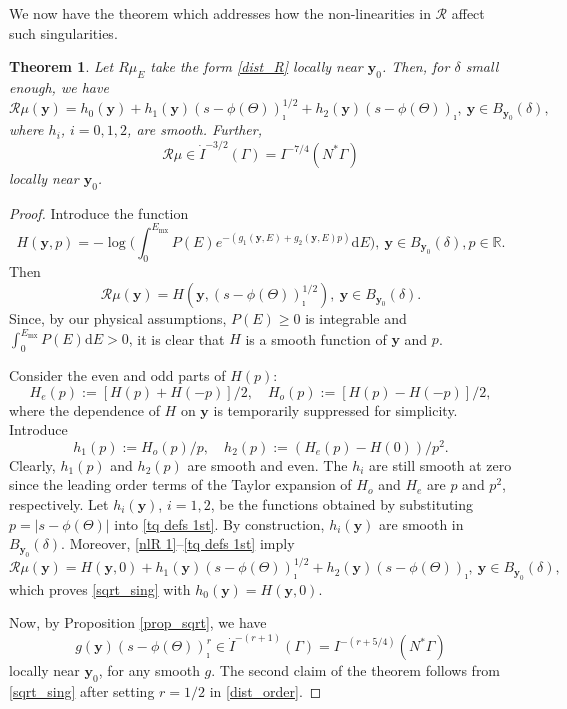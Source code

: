 \documentclass[11pt]{article}
\newcommand{\ac}[1]{\begin{quotation}\textbf{Sasha's comment:\
}{\textit{#1}}\end{quotation}}
\newcommand{\be}{\begin{equation}}
\newcommand{\ee}{\end{equation}}
\newcommand{\CR}{\mathcal R}
\newcommand{\br}{\mathbb{R}}
\newcommand{\dd}{\mathrm{d}}
\newcommand{\de}{\delta}
\numberwithin{equation}{section}
\newcommand{\vy}{\mathbf{y}}
\newtheorem{theorem}{Theorem}[section]
\theoremstyle{definition}
\begin{document}
We now have the theorem which addresses how the non-linearities in $\mathcal{R}$ affect such singularities.
\begin{theorem}
\label{log_sing}
Let $R\mu_E$ take the form \eqref{dist_R} locally near $\vy_0$. Then, for $\delta$ small enough, we have
\be
\label{sqrt_sing}
\mathcal{R}\mu(\vy) = h_0(\vy) + h_1(\vy) (s - \phi(\Theta))^{1/2}_\imath + h_2(\vy) (s - \phi(\Theta))_\imath,\ \vy\in B_{\vy_0}(\delta),
\ee
where $h_i$, $i=0,1,2$, are smooth. Further,
\be\label{Rmu distr}
\CR\mu \in \dot{I}^{-3/2}(\Gamma)=I^{-7/4}(N^*\Gamma)
\ee
locally near $\vy_0$.
\end{theorem}
\begin{proof}






Introduce the function
\be
H(\vy,p) = -\log\Big(\int_0^{E_{\mathrm{mx}}}P(E) e^{-(g_1(\vy,E) + g_2(\vy,E)p)} \dd E\Big),\ \vy\in B_{\vy_0}(\delta),p\in\br.
\ee
Then
\be
\label{nlR 1}
\CR\mu(\vy) = H(\vy,(s - \phi(\Theta))^{1/2}_\imath),\ \vy\in B_{\vy_0}(\delta).
\ee
Since, {by our physical assumptions,} $P(E) \geq 0$ is integrable {and $\int_0^{E_{\text{mx}}}P(E)\mathrm{d}E > 0$,} it is clear that $H$ is a smooth function of $\vy$ and $p$.  

Consider the even and odd parts of $H(p)$:
\be\label{tH 1st}
H_e(p):=[H(p)+H(-p)]/2,\quad
H_o(p):=[H(p)-H(-p)]/2,
\ee
where the dependence of $H$ on $\vy$ is temporarily suppressed for simplicity. Introduce
\be\label{tq defs 1st}
h_1(p):=H_o(p)/p,\quad h_2(p):=(H_e(p)-H(0))/p^2.
\ee
Clearly, $h_1(p)$ and $h_2(p)$ are smooth and even. The $h_i$ are still smooth at zero since the leading order terms of the Taylor expansion of $H_o$ and $H_e$ are $p$ and $p^2$, respectively. Let $h_i(\vy)$, $i=1,2$, be the functions obtained by substituting $p=|s - \phi(\Theta)|$ into \eqref{tq defs 1st}. By construction, $h_i(\vy)$ are smooth in $B_{\vy_0}(\de)$. Moreover, \eqref{nlR 1}--\eqref{tq defs 1st} imply
\be
\label{nlR 2}
\CR\mu(\vy) = H(\vy,0)+h_1(\vy)(s - \phi(\Theta))^{1/2}_\imath + h_2(\vy)(s - \phi(\Theta))_\imath,\ \vy\in B_{\vy_0}(\delta),
\ee
which proves \eqref{sqrt_sing} with $h_0(\vy)=H(\vy,0)$.

Now, by Proposition \ref{prop_sqrt}, we have 
\be
\label{dist_order}
g(\vy) (s - \phi(\Theta))^r_\imath \in \dot{I}^{-(r+1)}(\Gamma)=I^{-(r+5/4)}(N^*\Gamma)
\ee
locally near $\vy_0$, for any smooth $g$. The second claim of the theorem follows from \eqref{sqrt_sing} after setting $r = 1/2$ in \eqref{dist_order}.
\end{proof}
\end{document}

